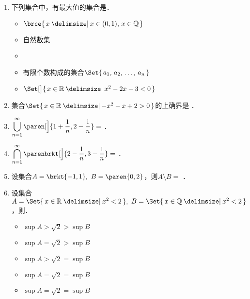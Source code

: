 \begin{enumerate}
\item 下列集合中，有最大值的集合是\uline{\makebox[4em]{}}．
  \begin{itemize}
    \renewcommand{\labelitemi}{\faCircleThin}
  \item \(\brce{\,x \mid x \in (0, 1),\, x \in \Q\,}\)
  \item 自然数集
    \ifshowsol
    \item[\faCircle]
    \else
    \item
    \fi
    有限个数构成的集合\(\Set{\,a_1,\, a_2,\, \dots,\, a_n\,}\)
  \item \(\Set[\big]{\,x \in \R \mid x^2 - 2x -3 < 0\,}\)
  \end{itemize}

\item 集合\(\Set{\,x \in \R \mid -x^2 - x + 2 > 0\,}\)的上确界是
  \ifshowsol
    \uline{}
  \else
    \uline{\makebox[4em]{}}%
  \fi．

\item \(\displaystyle \bigcup_{n=1}^\infty \paren[\Big]{1 + \frac1n, 2 - \frac1n} =\)
  \ifshowsol
    \uline{}
  \else
    \uline{\makebox[4em]{}}%
  \fi．

\item \(\displaystyle \bigcap_{n=1}^\infty \parenbrkt[\Big]{2-\frac1n, 3-\frac1n} =\)
  \ifshowsol
    \uline{}
  \else
    \uline{\makebox[4em]{}}%
  \fi．

\item 设集合\(A = \brkt{-1,1},\ B = \paren{0,2}\)，则\(A \setminus B =\)
  \ifshowsol
    \uline{}
  \else
    \uline{\makebox[4em]{}}%
  \fi．

\item 设集合\(A = \Set{\,x \in \R \mid x^2 < 2\,},\ B = \Set{\,x \in \Q \mid x^2 < 2\,}\)，则\uline{\makebox[4em]{}}．
  \begin{itemize}
    \renewcommand{\labelitemi}{\faCircleThin}
  \item \(\sup A > \sqrt2 > \sup B\)
  \item \(\sup A = \sqrt2 > \sup B\)
  \item \(\sup A > \sqrt2 = \sup B\)
    \ifshowsol
    \item[\faCircle] \(\sup A = \sqrt2 = \sup B\)
    \else
    \item \(\sup A = \sqrt2 = \sup B\)
    \fi
  \end{itemize}


\end{enumerate}
